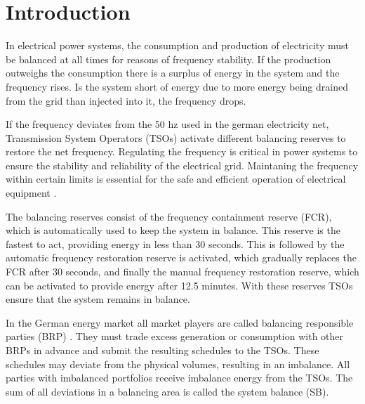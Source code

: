 \documentclass[class=scrbook, crop=false]{standalone}
\begin{document}
\chapter{Introduction}
\label{Chapter::Introduction}

In electrical power systems, the consumption and production of electricity must be balanced at all times for reasons of frequency stability\cite{weitemeyerIntegrationRenewableEnergy2015}. If the production outweighs the consumption there is a surplus of energy in the system and the frequency rises. Is the system short of energy due to more energy being drained from the grid than injected into it, the frequency drops.

If the frequency deviates from the 50 hz used in the german electricity net, Transmission System Operators (TSOs) activate different balancing reserves to restore the net frequency.
Regulating the frequency is critical in power systems to ensure the stability and reliability of the electrical grid.
Maintaning the frequency within certain limits is essential for the safe and efficient operation of electrical equipment \cite{balazsShorttermSystemImbalance2024}.

The balancing reserves consist of the frequency containment reserve (FCR), which is automatically used to keep the system in balance. This reserve is the fastest to act, providing energy in less than 30 seconds. This is followed by the automatic frequency restoration reserve is activated, which gradually replaces the FCR after 30 seconds, and finally the manual frequency restoration reserve, which can be activated to provide energy after 12.5 minutes. With these reserves TSOs ensure that the system remains in balance\cite{FrequencyReserves}.


In the German energy market all market players are called balancing responsible parties (BRP) \cite{narajewskiProbabilisticForecastingGerman2022}. 
They must trade excess generation or consumption with other BRPs in advance and submit the resulting schedules to the TSOs. 
These schedules may deviate from the physical volumes, resulting in an imbalance. All parties with imbalanced portfolios receive imbalance energy from the TSOs. 
The sum of all deviations in a balancing area is called the system balance (SB)\cite{eickeElectricityBalancingMarket2021}.
\end{document}
